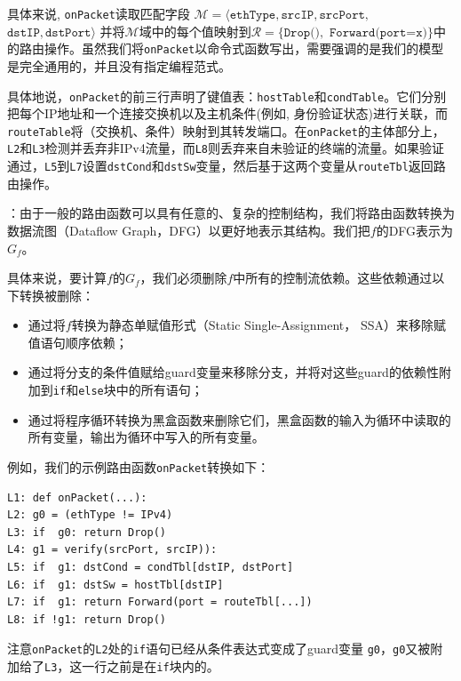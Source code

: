 具体来说, \texttt{onPacket}读取匹配字段
$\mathcal{M} = \langle \texttt{ethType}, \texttt{srcIP}, \texttt{srcPort},$ $ \texttt{dstIP}, \texttt{dstPort} \rangle$ 
并将$\mathcal{M}$域中的每个值映射到$\mathcal{R}=\{\texttt{Drop()}, $ $\texttt{Forward(port=x)} \}$中的路由操作。虽然我们将\texttt{onPacket}以命令式函数写出，需要强调的是我们的模型是完全通用的，并且没有指定编程范式。


具体地说，\texttt{onPacket}的前三行声明了键值表：\texttt{hostTable}和\texttt{condTable}。它们分别把每个IP地址和一个连接交换机以及主机条件(例如, 身份验证状态)进行关联，而\texttt{routeTable}将（交换机、条件）映射到其转发端口。在\texttt{onPacket}的主体部分上，\texttt{L2}和\texttt{L3}检测并丢弃非IPv4流量，而\texttt{L8}则丢弃来自未验证的终端的流量。如果验证通过，\texttt{L5}到\texttt{L7}设置\texttt{dstCond}和\texttt{dstSw}变量，然后基于这两个变量从\texttt{routeTbl}返回路由操作。



：由于一般的路由函数可以具有任意的、复杂的控制结构，我们将路由函数转换为数据流图（Dataflow Graph，DFG）以更好地表示其结构。我们把$f$的DFG表示为$G_f$。

具体来说，要计算$f$的$G_f$，我们必须删除$f$中所有的控制流依赖。这些依赖通过以下转换被删除：

\begin{itemize}
  \item 通过将$f$转换为静态单赋值形式（Static Single-Assignment， SSA）来移除赋值语句顺序依赖；
  \item 通过将分支的条件值赋给guard变量来移除分支，并将对这些guard的依赖性附加到\texttt{if}和\texttt{else}块中的所有语句；
  \item 通过将程序循环转换为黑盒函数来删除它们，黑盒函数的输入为循环中读取的所有变量，输出为循环中写入的所有变量。
\end{itemize}

例如，我们的示例路由函数\texttt{onPacket}转换如下：

{\small
\begin{verbatim}
L1: def onPacket(...):
L2: g0 = (ethType != IPv4)
L3: if  g0: return Drop()
L4: g1 = verify(srcPort, srcIP)):
L5: if  g1: dstCond = condTbl[dstIP, dstPort]
L6: if  g1: dstSw = hostTbl[dstIP]
L7: if  g1: return Forward(port = routeTbl[...])
L8: if !g1: return Drop()
\end{verbatim}
}

注意\texttt{onPacket}的\texttt{L2}处的\texttt{if}语句已经从条件表达式变成了guard变量 \texttt{g0}，\texttt{g0}又被附加给了\texttt{L3}，这一行之前是在\texttt{if}块内的。

